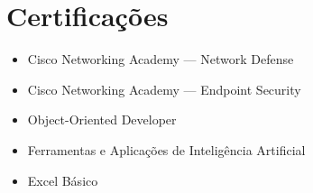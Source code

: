\documentclass[11pt,a4paper]{article}
\begin{document}
\section{Certificações}
\begin{itemize}
  \item Cisco Networking Academy --- Network Defense
  \item Cisco Networking Academy --- Endpoint Security
  \item Object-Oriented Developer
  \item Ferramentas e Aplicações de Inteligência Artificial
  \item Excel Básico
\end{itemize}
\end{document}
